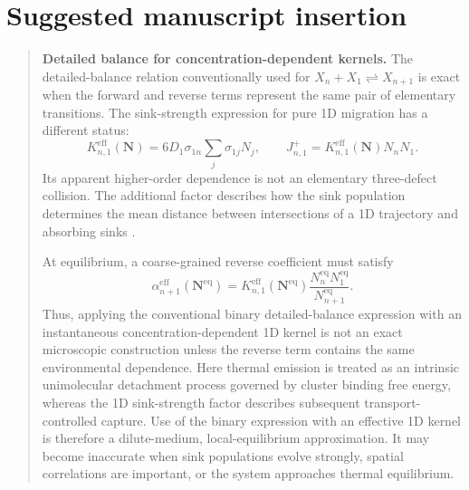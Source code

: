 \documentclass[11pt]{article}
\newcommand{\beq}{\mathrm{eq}}
\newcommand{\eff}{\mathrm{eff}}
\begin{document}
\section{Suggested manuscript insertion}
\begin{quote}
\textbf{Detailed balance for concentration-dependent kernels.}
The detailed-balance relation conventionally used for
\(X_n+X_1\rightleftharpoons X_{n+1}\) is exact when the forward and reverse
terms represent the same pair of elementary transitions. The sink-strength
expression for pure 1D migration has a different status:
\[
K^{\eff}_{n,1}(\bm N)=6D_1\sigma_{1n}\sum_j\sigma_{1j}N_j,\qquad
J^+_{n,1}=K^{\eff}_{n,1}(\bm N)N_nN_1.
\]
Its apparent higher-order dependence is not an elementary three-defect
collision. The additional factor describes how the sink population determines
the mean distance between intersections of a 1D trajectory and absorbing
sinks \cite{Borodin1998,Barashev2001,Trinkaus2002}.

At equilibrium, a coarse-grained reverse coefficient must satisfy
\[
\alpha^{\eff}_{n+1}(\bm N^{\beq})
=K^{\eff}_{n,1}(\bm N^{\beq})
\frac{N_n^{\beq}N_1^{\beq}}{N_{n+1}^{\beq}}.
\]
Thus, applying the conventional binary detailed-balance expression with an
instantaneous concentration-dependent 1D kernel is not an exact microscopic
construction unless the reverse term contains the same environmental
dependence. Here thermal emission is treated as an intrinsic unimolecular
detachment process governed by cluster binding free energy, whereas the 1D
sink-strength factor describes subsequent transport-controlled capture. Use
of the binary expression with an effective 1D kernel is therefore a
dilute-medium, local-equilibrium approximation. It may become inaccurate when
sink populations evolve strongly, spatial correlations are important, or the
system approaches thermal equilibrium.
\end{quote}
\end{document}
